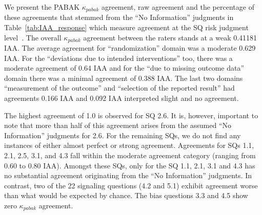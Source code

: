 \documentclass[sn-mathphys,Numbered]{sn-jnl}%
\theoremstyle{thmstyleone}%
\theoremstyle{thmstyletwo}%
\theoremstyle{thmstylethree}%
\begin{document}
We present the PABAK $\kappa_{pabak}$ agreement, raw agreement and the percentage of these agreements that stemmed from the ``No Information'' judgments in Table~\ref{tab:IAA_response} which measure agreement at the SQ risk judgment level~\cite{mchugh2012interrater}.
The overall $\kappa_{pabak}$ agreement between the raters stands at a weak 0.41181 IAA.
The average agreement for ``randomization'' domain was a moderate 0.629 IAA.
For the ``deviations due to intended interventions'' too, there was a moderate agreement of 0.64 IAA and for the ``due to missing outcome data'' domain there was a minimal agreement of 0.388 IAA.
The last two domains ``measurement of the outcome'' and ``selection of the reported result'' had agreements 0.166 IAA and 0.092 IAA interpreted slight and no agreement.



The highest agreement of 1.0 is observed for SQ 2.6.
It is, however, important to note that more than half of this agreement arises from the assumed ``No Information'' judgments for 2.6.
For the remaining SQs, we do not find any instances of either almost perfect or strong agreement.
Agreements for SQs 1.1, 2.1, 2.5, 3.1, and 4.3 fall within the moderate agreement category (ranging from 0.60 to 0.80 IAA).
Amongst these SQs, only for the SQ 1.1, 2.1, 3.1 and 4.3 has no substantial agreement originating from the ``No Information'' judgments.
In contrast, two of the 22 signaling questions (4.2 and 5.1) exhibit agreement worse than what would be expected by chance.
The bias questions 3.3 and 4.5 show zero $\kappa_{pabak}$ agreement.
\end{document}
